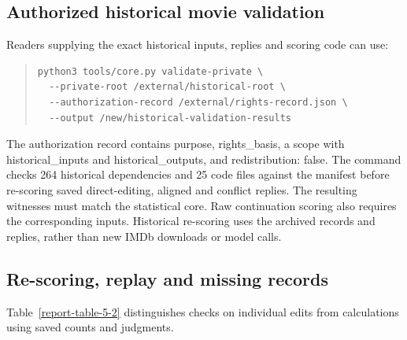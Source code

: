\documentclass[10pt,a4paper]{article}
\begin{document}
\subsection{Authorized historical movie validation}

Readers supplying the exact historical inputs, replies and scoring code can use:

\begin{quote}
\begin{Verbatim}[fontsize=\footnotesize,fontfamily=cmtt,formatcom={\fontencoding{OT1}\selectfont\def\textasciigrave{\char18}\def\textquotesingle{\char13}}]
python3 tools/core.py validate-private \
  --private-root /external/historical-root \
  --authorization-record /external/rights-record.json \
  --output /new/historical-validation-results
\end{Verbatim}
\end{quote}

The authorization record contains {\ttfamily\small purpose}, {\ttfamily\small rights\_\allowbreak{}basis}, a {\ttfamily\small scope} with {\ttfamily\small historical\_\allowbreak{}inputs} and {\ttfamily\small historical\_\allowbreak{}outputs}, and {\ttfamily\small redistribution: false}. The command checks 264 historical dependencies and 25 code files against the manifest before re-scoring saved direct-editing, aligned and conflict replies. The resulting witnesses must match the statistical core. Raw continuation scoring also requires the corresponding inputs. Historical re-scoring uses the archived records and replies, rather than new IMDb downloads or model calls.

\subsection{Re-scoring, replay and missing records}

Table~\ref{report-table-5-2} distinguishes checks on individual edits from calculations using
saved counts and judgments.
\end{document}
